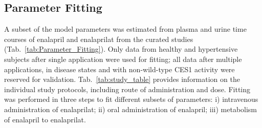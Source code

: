 \subsection{Parameter Fitting}
\label{sec:results_parameter_fitting}
{\color{red}A subset of the model parameters was estimated from plasma and urine time courses of enalapril and enalaprilat from the curated studies~\cite{Arafat2005, Ghosh2012, Ishizaki1988} (Tab.~\ref{tab:Parameter_Fitting}). Only data from healthy and hypertensive subjects after single application were used for fitting; all data after multiple applications, in disease states and with non-wild-type CES1 activity were reserved for validation. Tab.~\ref{tab:study_table} provides information on the individual study protocols, including route of administration and dose.} 
Fitting was performed in three steps to fit different subsets of parameters: i) intravenous administration of enalaprilat; ii) oral administration of enalapril; iii) metabolism of enalapril to enalaprilat.

